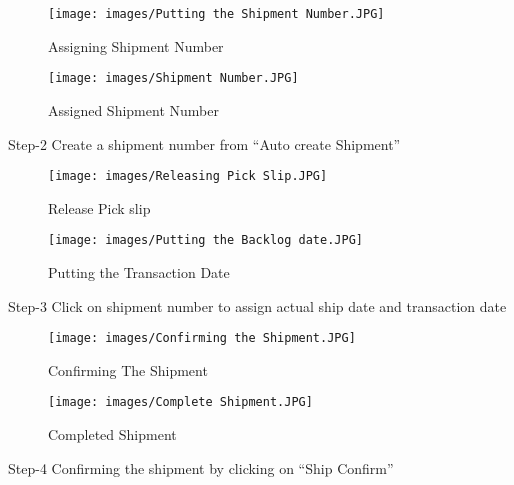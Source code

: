 \begin{figure} [H]
    \centering
    \texttt{[image: images/Putting the Shipment Number.JPG]}
    \caption{Assigning Shipment Number}
    \label{fig:my_label}
\end{figure}
    
\begin{figure} [H]
    \centering
    \texttt{[image: images/Shipment Number.JPG]}
    \caption{Assigned Shipment Number}
    \label{fig:my_label}
\end{figure}
Step-2
Create a shipment number from “Auto create Shipment”
\begin{figure} [H]
    \centering
    \texttt{[image: images/Releasing Pick Slip.JPG]}
    \caption{Release Pick slip}
    \label{fig:my_label}
\end{figure}
\begin{figure} [H]
    \centering
    \texttt{[image: images/Putting the Backlog date.JPG]}
    \caption{Putting the Transaction Date}
    \label{fig:my_label}
\end{figure}

Step-3
Click on shipment number to assign actual ship date and transaction date

\begin{figure} [H]
    \centering
    \texttt{[image: images/Confirming the Shipment.JPG]}
    \caption{Confirming The Shipment}
    \label{fig:my_label}
\end{figure}
\begin{figure} [H]
    \centering
    \texttt{[image: images/Complete Shipment.JPG]}
    \caption{Completed Shipment}
    \label{fig:my_label}
\end{figure}
Step-4 
Confirming the shipment by clicking on “Ship Confirm”
